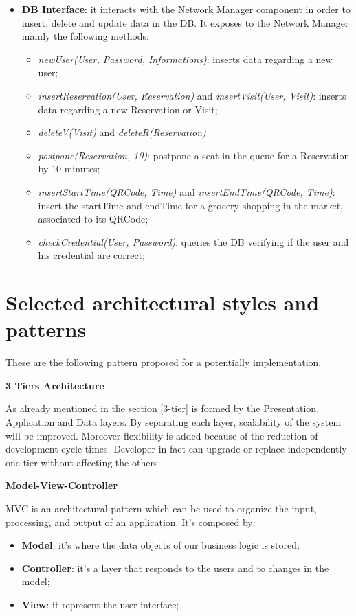 \begin{itemize}
\item \textbf{DB Interface}: it interacts with the Network Manager component in order to insert, delete and update data in the DB. It exposes to the Network Manager mainly the following methods:
\begin{itemize}
\item \textit{newUser(User, Password, Informations)}: inserts data regarding a new user;
\item \textit{insertReservation(User, Reservation)} and \textit{insertVisit(User, Visit)}: inserts data regarding a new Reservation or Visit;
\item \textit{deleteV(Visit)} and \textit{deleteR(Reservation)}
\item \textit{postpone(Reservation, 10)}: postpone a seat in the queue for a Reservation by 10 minutes;
\item \textit{insertStartTime(QRCode, Time)} and  \textit{insertEndTime(QRCode, Time)}: insert the startTime and endTime for a grocery shopping in the market, associated to its QRCode;
\item \textit{checkCredential(User, Password)}: queries the DB verifying if the user and his credential are correct;
\end{itemize}

\end{itemize}


\section{Selected architectural styles and patterns}
These are the following pattern proposed for a potentially implementation.
\bigskip

\textbf{3 Tiers Architecture} \par
As already mentioned in the section \ref{3-tier} is formed by the Presentation, Application and Data layers. By separating each layer, scalability of the system will be improved.
Moreover flexibility is added because of the reduction of development cycle times. Developer in fact can upgrade or replace independently one tier without affecting the others. 
\bigskip

\textbf{Model-View-Controller} \par
MVC is an architectural pattern which can be used to organize the input, processing, and output of an application. It's composed by:
\begin{itemize}
\item \textbf{Model}: it's where the data objects of our business logic is stored;
\item \textbf{Controller}: it's a layer that responds to the users and to changes in the model;
\item \textbf{View}: it represent the user interface;
\end{itemize}

